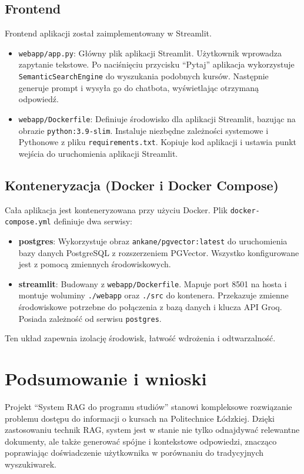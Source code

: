 \documentclass{article}
\begin{document}
\subsection{Frontend}
Frontend aplikacji został zaimplementowany w Streamlit.
\begin{itemize}
    \item \texttt{webapp/app.py}: Główny plik aplikacji Streamlit. Użytkownik wprowadza zapytanie tekstowe. Po naciśnięciu przycisku ``Pytaj'' aplikacja wykorzystuje \texttt{SemanticSearchEngine} do wyszukania podobnych kursów. Następnie generuje prompt i wysyła go do chatbota, wyświetlając otrzymaną odpowiedź.
    \item \texttt{webapp/Dockerfile}: Definiuje środowisko dla aplikacji Streamlit, bazując na obrazie \texttt{python:3.9-slim}. Instaluje niezbędne zależności systemowe i Pythonowe z pliku \texttt{requirements.txt}. Kopiuje kod aplikacji i ustawia punkt wejścia do uruchomienia aplikacji Streamlit.
\end{itemize}

\subsection{Konteneryzacja (Docker i Docker Compose)}
Cała aplikacja jest konteneryzowana przy użyciu Docker. Plik \texttt{docker-compose.yml} definiuje dwa serwisy:
\begin{itemize}
    \item \textbf{postgres}: Wykorzystuje obraz \texttt{ankane/pgvector:latest} do uruchomienia bazy danych PostgreSQL z rozszerzeniem PGVector. Wszystko konfigurowane jest z pomocą zmiennych środowiskowych.
    \item \textbf{streamlit}: Budowany z \texttt{webapp/Dockerfile}. Mapuje port 8501 na hosta i montuje woluminy \texttt{./webapp} oraz \texttt{./src} do kontenera. Przekazuje zmienne środowiskowe potrzebne do połączenia z bazą danych i klucza API Groq. Posiada zależność od serwisu \texttt{postgres}.
\end{itemize}
Ten układ zapewnia izolację środowisk, łatwość wdrożenia i odtwarzalność.

\section{Podsumowanie i wnioski}
Projekt ``System RAG do programu studiów'' stanowi kompleksowe rozwiązanie problemu dostępu do informacji o kursach na Politechnice Łódzkiej. Dzięki zastosowaniu technik RAG, system jest w stanie nie tylko odnajdywać relewantne dokumenty, ale także generować spójne i kontekstowe odpowiedzi, znacząco poprawiając doświadczenie użytkownika w porównaniu do tradycyjnych wyszukiwarek.
\end{document}
